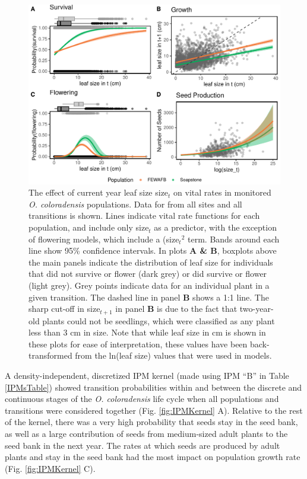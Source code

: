 \documentclass[12pt, letterpaper]{article}
\begin{document}
\begin{figure}[h!]
  \centering
  \includegraphics[width=\textwidth]{figures/vitalRateModelFit_withBoxplots.pdf}
  \caption{\internallinenumbers The effect of current year leaf size size$_t$ on vital rates in monitored \textit{O. coloradensis} populations. Data for from all sites and all transitions is shown. Lines indicate vital rate functions for each population, and include only size$_t$ as a predictor, with the exception of flowering models, which include a (size$_t$$^2$ term. Bands around each line show 95\% confidence intervals. In plots \textbf{A & B}, boxplots above the main panels indicate the distribution of leaf size for individuals that did not survive or flower (dark grey) or did survive or flower (light grey). Grey points indicate data for an individual plant in a given transition.  The dashed line in panel \textbf{B} shows a 1:1 line. The sharp cut-off in size$_{t+1}$ in panel \textbf{B} is due to the fact that two-year-old plants could not be seedlings, which were classified as any plant less than 3 cm in size. Note that while leaf size in cm is shown in these plots for ease of interpretation, these values have been back-transformed from the ln(leaf size) values that were used in models.}
  \label{fig:vitalRates}
\end{figure} 


A density-independent, discretized IPM kernel (made using IPM “B” in Table \ref{IPMsTable}) showed transition probabilities within and between the discrete and continuous stages of the \textit{O. coloradensis} life cycle when all populations and transitions were considered together (Fig. \ref{fig:IPMKernel} A). Relative to the rest of the kernel, there was a very high probability that seeds stay in the seed bank, as well as a large contribution of seeds from medium-sized adult plants to the seed bank in the next year. The rates at which seeds are produced by adult plants and stay in the seed bank had the most impact on population growth rate (Fig. \ref{fig:IPMKernel} C).
\end{document}
